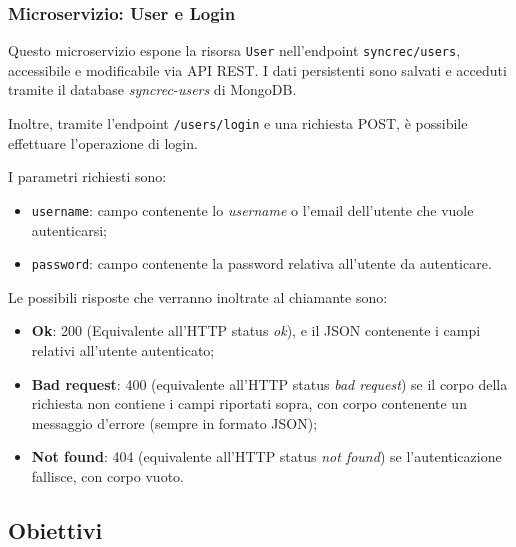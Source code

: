 
\subsubsection{Microservizio: User e Login}

Questo microservizio espone la risorsa \texttt{User} nell'endpoint
\texttt{syncrec/users}, accessibile e modificabile via API REST. I dati persistenti sono salvati e acceduti tramite il database \textit{syncrec-users} di
MongoDB.

Inoltre, tramite l'endpoint \texttt{/users/login} e una richiesta POST,
è possibile effettuare l'operazione di login.

I parametri richiesti sono:
\begin{itemize}
	\item \texttt{username}: campo contenente lo \textit{username} o l'email dell'utente che vuole autenticarsi;
	\item \texttt{password}: campo contenente la password relativa all'utente da autenticare.
\end{itemize}

Le possibili risposte che verranno inoltrate al chiamante sono:
\begin{itemize}
	\item \textbf{Ok}: 200 (Equivalente all'HTTP status \textit{ok}), e il JSON contenente i campi relativi all'utente autenticato;
	\item \textbf{Bad request}: 400 (equivalente all'HTTP status \textit{bad request}) se il corpo della richiesta non contiene i campi riportati sopra, con corpo contenente un messaggio d'errore (sempre in formato JSON);
	\item \textbf{Not found}: 404 (equivalente all'HTTP status \textit{not found}) se l'autenticazione fallisce, con corpo vuoto.
\end{itemize}



\subsection{Obiettivi}

